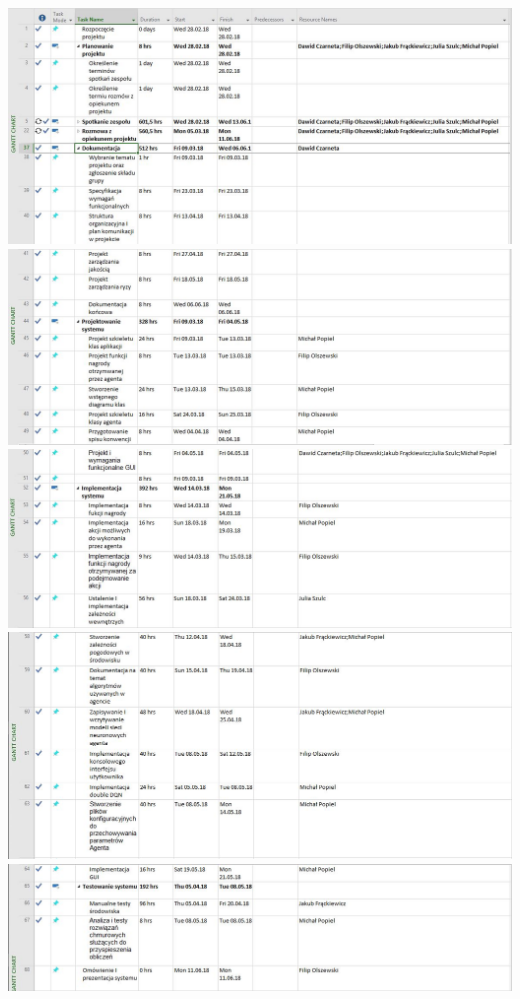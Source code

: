 \documentclass{article}
\begin{document}
\includegraphics[width=1\textwidth, left]{final/1.JPG}
\includegraphics[width=1\textwidth, left]{final/2.JPG}
\includegraphics[width=1\textwidth, left]{final/3.JPG}
\includegraphics[width=1\textwidth, left]{final/4.JPG}
\includegraphics[width=1\textwidth, left]{final/5.JPG}
\end{document}
